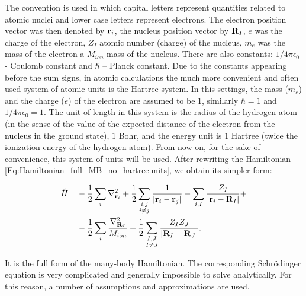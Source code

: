 The convention is used in which capital letters represent quantities related to atomic nuclei and lower case letters represent electrons.
The electron position vector was then denoted by $\mathbf{r}_i$, the nucleus position vector by $\mathbf{R}_I$, $e$ was the charge of the electron, $Z_I$ atomic number (charge) of the nucleus, $m_e$ was the mass of the electron a $M_{ion}$ mass of the nucleus.
There are also constants: $1/4 \pi \epsilon_0$ - Coulomb constant and $\hbar$ -- Planck constant. Due to the constants appearing before the sum signs, in atomic calculations the much more convenient and often used system of atomic units is the Hartree system.
In this settings, the mass ($m_e$) and the charge ($e$) of the electron are assumed to be $1$, similarly $\hbar = 1$ and $ 1/4 \pi \epsilon_0 = 1$.
The unit of length in this system is the radius of the hydrogen atom (in the sense of the value of the expected distance of the electron from the nucleus in the ground state), $1$ Bohr, and the energy unit is $1$ Hartree (twice the ionization energy of the hydrogen atom).
From now on, for the sake of convenience, this system of units will be used.
After rewriting the Hamiltonian \ref {Eq:Hamiltonian_full_MB_no_hartreeunits}, we obtain its simpler form: 

\begin{equation}
    \label{Eq:Hamiltonian_full_MB}
    \begin{aligned}
        \hat{H}=
        &-\frac{1}{2}\sum_{i}\nabla^2_{\mathbf{r}_i}+\frac{1}{2}\sum_{\substack{i,j\\i\neq j}}\frac{1}{|\mathbf{r}_i-\mathbf{r}_j|}-\sum_{i,I}\frac{Z_I}{|\mathbf{r}_i-\mathbf{R}_I|}+\\
        &-\frac{1}{2}\sum_{i}\frac{\nabla^2_{\mathbf{R}_I}}{M_{ion}}+\frac{1}{2}\sum_{\substack{I,J\\I\neq J}}\frac{Z_IZ_J}{|\mathbf{R}_I-\mathbf{R}_J|}.
    \end{aligned}
\end{equation}

It is the full form of the many-body Hamiltonian.
The corresponding Schr\"odinger equation is very complicated and generally impossible to solve analytically.
For this reason, a number of assumptions and approximations are used.

